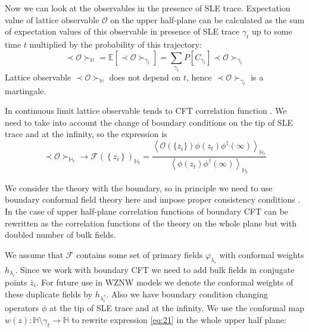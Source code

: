 \documentclass[a4paper]{jpconf}
\theoremstyle{definition}
\theoremstyle{definition} \newtheorem{Def}{Definition}
\begin{document}
Now we can look at the observables in the presence of SLE trace. Expectation value of lattice observable $\mathcal{O}$ on the upper half-plane can be calculated as the sum of expectation values of this observable in presence of SLE trace $\gamma_{t}$ up to some time $t$ multiplied by the probability of this trajectory:
\begin{equation*}
  \prec \mathcal{O} \succ_{\mathbb{H}}=\mathbb{E}\left[\prec\mathcal{O}\succ_{\gamma_{t}}\right]=\sum_{\gamma_{t}} P\left[C_{\gamma_{t}}\right] \prec \mathcal{O} \succ_{\gamma_{t}}
\end{equation*}
Lattice observable  $\prec \mathcal{O} \succ_{\mathbb{H}}$ does not depend on $t$, hence $\prec\mathcal{O}\succ_{\gamma_{t}}$ is a martingale.

In continuous limit lattice observable tends to CFT correlation function \cite{bauer2003sle,bauer2003conformal,bauer2002sle}.
We need to take into account the change of boundary conditions on the tip of SLE trace and at the infinity, so the expression is
\begin{equation}
  \prec \mathcal{O} \succ_{\mathbb{H}_{t}}\to \mathcal{F}(\left\{z_{i}\right\})_{\mathbb{H}_{t}}=
  \frac{\left< \mathcal{O}(\{z_{i}\})\phi(z_{t})\phi^{\dagger}(\infty)\right>_{\mathbb{H}_{t}}}{\left<\phi(z_{t})\phi^{\dagger}(\infty)\right>_{\mathbb{H}_{t}}}
\label{eq:21}
\end{equation}


We consider the theory with the boundary, so in principle we need to use boundary conformal field theory here and impose proper consistency conditions \cite{cardy1984conformal,cardy1989boundary,cardy1991bulk}. In the case of upper half-plane correlation functions of boundary CFT can be rewritten as the correlation functions of the theory on the whole plane but with doubled number of bulk fields.


We assume that $\mathcal{F}$ contains some set of primary fields $\varphi_{\lambda_{i}}$ with conformal weights $h_{\lambda_{i}}$. Since we work with boundary CFT we need to add bulk fields in conjugate points $\bar z_{i}$. For future use in WZNW models we denote the conformal weights of these duplicate fields by $h_{\lambda_{i}^{*}}$.  Also we have boundary condition changing operators  $\phi$ at the tip of SLE trace and at the infinity.  We use the conformal map  $w(z):\mathbb{H}\setminus\gamma_{t}\to \mathbb{H}$ to rewrite expression \eqref{eq:21} in the whole upper half plane:
\end{document}
